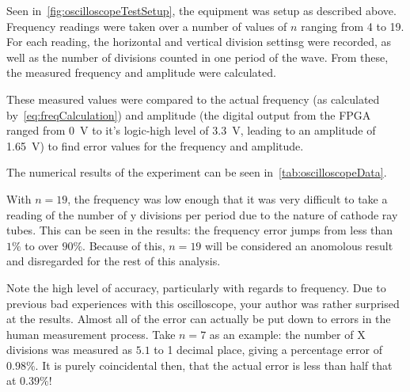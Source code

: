 Seen in~\cref{fig:oscilloscopeTestSetup}, the equipment was setup as described above. Frequency readings
were taken over a number of values of $n$ ranging from 4 to 19. For each
reading, the horizontal and vertical division settinsg were recorded, as well as
the number of divisions counted in one period of the wave. From these, the
measured frequency and amplitude were calculated.

These measured values were compared to the actual frequency (as calculated
by~\cref{eq:freqCalculation}) and amplitude (the digital output from the FPGA
ranged from \SI{0}{\V} to it's logic-high level of \SI{3.3}{\V}, leading
to an amplitude of \SI{1.65}{\V}) to find error values for the frequency and
amplitude.

The numerical results of the experiment can be seen
in~\cref{tab:oscilloscopeData}.

With $n=19$, the frequency was low enough that it was very difficult to take a
reading of the number of y divisions per period due to the nature of cathode ray
tubes. This can be seen in the results: the frequency error jumps from less than
$1\%$ to over $90\%$. Because of this, $n=19$ will be considered an anomolous
result and disregarded for the rest of this analysis.

Note the high level of accuracy, particularly with regards to frequency. Due to
previous bad experiences with this oscilloscope, your author was rather
surprised at the results.  Almost all of the error can actually be put down to
errors in the human measurement process. Take $n=7$ as an example: the number of
X divisions was measured as $5.1$ to 1 decimal place, giving a percentage error
of $0.98\%$. It is purely coincidental then, that the actual error is less than
half that at $0.39\%$!

